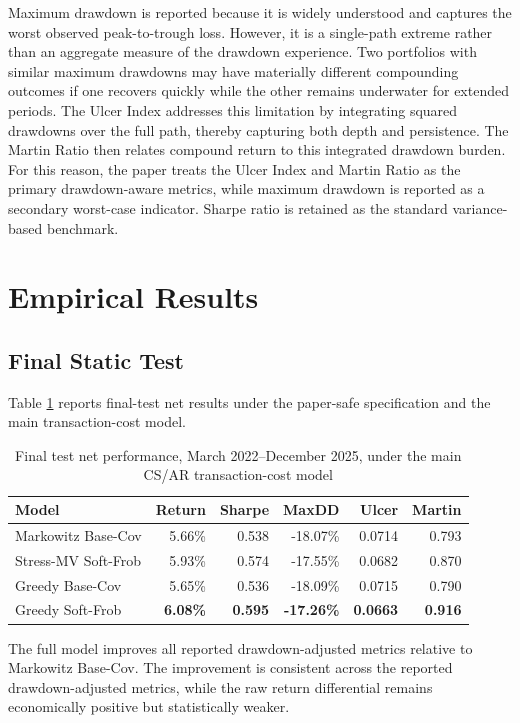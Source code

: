 \documentclass[11pt]{article}
\begin{document}
Maximum drawdown is reported because it is widely understood and captures the worst observed peak-to-trough loss. However, it is a single-path extreme rather than an aggregate measure of the drawdown experience. Two portfolios with similar maximum drawdowns may have materially different compounding outcomes if one recovers quickly while the other remains underwater for extended periods. The Ulcer Index addresses this limitation by integrating squared drawdowns over the full path, thereby capturing both depth and persistence. The Martin Ratio then relates compound return to this integrated drawdown burden. For this reason, the paper treats the Ulcer Index and Martin Ratio as the primary drawdown-aware metrics, while maximum drawdown is reported as a secondary worst-case indicator. Sharpe ratio is retained as the standard variance-based benchmark.

\section{Empirical Results}
\label{sec:results}

\subsection{Final Static Test}

Table \ref{tab:final_static} reports final-test net results under the paper-safe specification and the main transaction-cost model.

\begin{table}[h!]
\centering
\caption{Final test net performance, March 2022--December 2025, under the main CS/AR transaction-cost model}
\label{tab:final_static}
\begin{tabular}{lrrrrr}
\toprule
Model & Return & Sharpe & MaxDD & Ulcer & Martin \\
\midrule
Markowitz Base-Cov & 5.66\% & 0.538 & -18.07\% & 0.0714 & 0.793 \\
Stress-MV Soft-Frob & 5.93\% & 0.574 & -17.55\% & 0.0682 & 0.870 \\
Greedy Base-Cov & 5.65\% & 0.536 & -18.09\% & 0.0715 & 0.790 \\
Greedy Soft-Frob & \textbf{6.08\%} & \textbf{0.595} & \textbf{-17.26\%} & \textbf{0.0663} & \textbf{0.916} \\
\bottomrule
\end{tabular}
\end{table}

The full model improves all reported drawdown-adjusted metrics relative to Markowitz Base-Cov. The improvement is consistent across the reported drawdown-adjusted metrics, while the raw return differential remains economically positive but statistically weaker.
\end{document}
